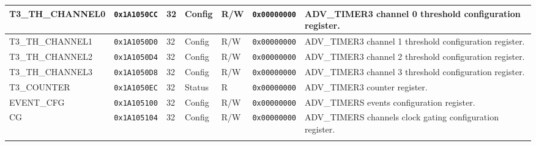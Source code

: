 {\begin{tabularx}{\textwidth}{|l|l|l|l|l|l|X|}
  \hline
  T3\_TH\_CHANNEL0 & \texttt{0x1A1050CC} & 32 & Config & R/W & \texttt{0x00000000} & ADV\_TIMER3 channel 0 threshold configuration register.\\
  \hline
  T3\_TH\_CHANNEL1 & \texttt{0x1A1050D0} & 32 & Config & R/W & \texttt{0x00000000} & ADV\_TIMER3 channel 1 threshold configuration register.\\
  \hline
  T3\_TH\_CHANNEL2 & \texttt{0x1A1050D4} & 32 & Config & R/W & \texttt{0x00000000} & ADV\_TIMER3 channel 2 threshold configuration register.\\
  \hline
  T3\_TH\_CHANNEL3 & \texttt{0x1A1050D8} & 32 & Config & R/W & \texttt{0x00000000} & ADV\_TIMER3 channel 3 threshold configuration register.\\
  \hline
  T3\_COUNTER & \texttt{0x1A1050EC} & 32 & Status & R & \texttt{0x00000000} & ADV\_TIMER3 counter register.\\
  \hline
  EVENT\_CFG & \texttt{0x1A105100} & 32 & Config & R/W & \texttt{0x00000000} & ADV\_TIMERS events configuration register.\\
  \hline
  CG & \texttt{0x1A105104} & 32 & Config & R/W & \texttt{0x00000000} & ADV\_TIMERS channels clock gating configuration register.\\
  \hline
  \caption{APB Advanced Timer}
\end{tabularx}
}




